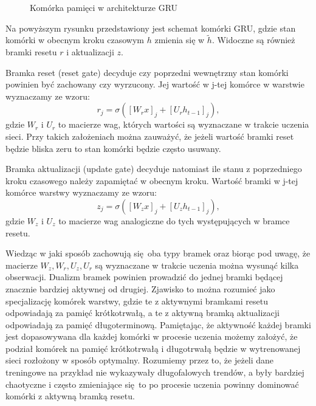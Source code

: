 \documentclass[10pt,a4paper]{article}
\begin{document}
\begin{figure}[!ht]
	\centering
	\caption{Komórka pamięci w architekturze GRU}
\end{figure}
\FloatBarrier

Na powyższym rysunku przedstawiony jest schemat komórki GRU, gdzie stan komórki w obecnym kroku czasowym $h$ zmienia się w $\widetilde{h}$. Widoczne są również bramki resetu $r$ i aktualizacji $z$. 

Bramka reset (reset gate) decyduje czy poprzedni wewnętrzny stan komórki powinien być zachowany czy wyrzucony. Jej wartość w j-tej komórce w warstwie wyznaczamy ze wzoru:
\begin{equation}
	r_j = \sigma([W_rx]_j + [U_rh_{t-1}]_j),
\end{equation} 
gdzie $W_r$ i $U_r$ to macierze wag, których wartości są wyznaczane w trakcie uczenia sieci. Przy takich założeniach można zauważyć, że jeżeli wartość bramki reset będzie bliska zeru to stan komórki będzie często usuwany.

Bramka aktualizacji (update gate) decyduje natomiast ile stanu z poprzedniego kroku czasowego należy zapamiętać w obecnym kroku. Wartość bramki w j-tej komórce warstwy wyznaczamy ze wzoru:
\begin{equation}
	z_j = \sigma([W_zx]_j + [U_zh_{t-1}]_j),
\end{equation} 
gdzie $W_z$ i $U_z$ to macierze wag analogiczne do tych występujących w bramce resetu. 

Wiedząc w jaki sposób zachowują się oba typy bramek oraz biorąc pod uwagę, że macierze $W_z, W_r, U_z, U_r$ są wyznaczane w trakcie uczenia można wysunąć kilka obserwacji. Dualizm bramek powinien prowadzić do jednej bramki będącej znacznie bardziej aktywnej od drugiej. Zjawisko to można rozumieć jako specjalizację komórek warstwy, gdzie te z aktywnymi bramkami resetu odpowiadają za pamięć krótkotrwałą, a te z aktywną bramką aktualizacji odpowiadają za pamięć długoterminową. Pamiętając, że aktywność każdej bramki jest dopasowywana dla każdej komórki w procesie uczenia możemy założyć, że podział komórek na pamięć krótkotrwałą i długotrwałą będzie w wytrenowanej sieci rozłożony w sposób optymalny. Rozumiemy przez to, że jeżeli dane treningowe na przykład nie wykazywały długofalowych trendów, a były bardziej chaotyczne i często zmieniające się to po procesie uczenia powinny dominować komórki z aktywną bramką resetu.
\end{document}
